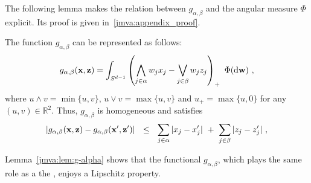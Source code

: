 %
The following lemma makes the relation between  $g_{\alpha,\beta}$ and  the angular measure
$\Phi$ explicit. Its proof is given in~\ref{jmva:appendix_proof}.
\begin{lemma}
\label{jmva:lem:g-alpha}
The function $g_{\alpha, \beta}$ can be represented as follows:
\begin{align*}
g_{\alpha, \beta}(\mathbf x, \mathbf z) = \int_{S^{d-1}} \left(\bigwedge_{j \in \alpha}{w_j x_j} - \bigvee_{j \in\beta} w_j z_j\right)_+~ \Phi(\mathrm{d} \mathbf w)~,
\end{align*}
where $u\wedge v=\min\{ u,v \}$, $u\vee v=\max\{ u,v \}$ and $u_+=\max\{u, 0\}$ for any $(u,v)\in \mathbb{R}^2$.
\noindent
Thus, $g_{\alpha, \beta}$ is homogeneous and satisfies
\begin{align*}
|g_{\alpha, \beta}(\mathbf x, \mathbf z) - g_{\alpha, \beta}(\mathbf x', \mathbf z')| ~~\le~~  \sum_{j \in \alpha}|x_j - x_j'| ~+~  \sum_{j \in \beta}|z_j - z_j'|~,
\end{align*}
\end{lemma}
\begin{remark}
Lemma~\ref{jmva:lem:g-alpha} shows that the functional $g_{\alpha, \beta}$, which plays the same role as a  the \stdf, enjoys  a Lipschitz property.
\end{remark}

